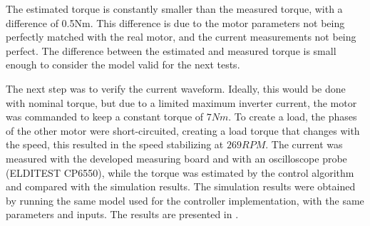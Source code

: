 \documentclass[9pt,conference]{IEEEtran}
\begin{document}
The estimated torque is constantly smaller than the measured torque, with a difference of 0.5Nm. This difference is due to the motor parameters not being perfectly matched with the real motor, and the current measurements not being perfect. The difference between the estimated and measured torque is small enough to consider the model valid for the next tests.

The next step was to verify the current waveform. Ideally, this would be done with nominal torque, but due to a limited maximum inverter current, the motor was commanded to keep a constant torque of $7Nm$. To create a load, the phases of the other motor were short-circuited, creating a load torque that changes with the speed, this resulted in the speed stabilizing at $269RPM$. The current was measured with the developed measuring board and with an oscilloscope probe (ELDITEST CP6550), while the torque was estimated by the control algorithm and compared with the simulation results. The simulation results were obtained by running the same model used for the controller implementation, with the same parameters and inputs. The results are presented in .
\end{document}
